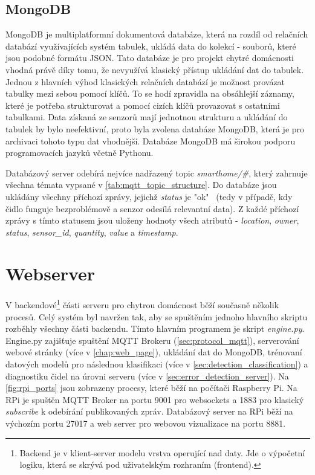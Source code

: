\subsection*{MongoDB}
MongoDB je multiplatformní dokumentová databáze, která na rozdíl od relačních databází využívajících systém tabulek, ukládá data do kolekcí - souborů, které jsou podobné formátu JSON. Tato databáze je pro projekt chytré domácnosti vhodná právě díky tomu, že nevyužívá klasický přístup ukládání dat do tabulek. Jednou z hlavních výhod klasických relačních databází je možnost provázat tabulky mezi sebou pomocí klíčů. To se hodí zpravidla na obsáhlejší záznamy, které je potřeba strukturovat a pomocí cizích klíčů provazovat s ostatními tabulkami. Data získaná ze senzorů mají jednotnou strukturu a ukládání do tabulek by bylo neefektivní, proto byla zvolena databáze MongoDB, která je pro archivaci tohoto typu dat vhodnější. Databáze MongoDB má širokou podporu programovacích jazyků včetně Pythonu. \par
Databázový server odebírá nejvíce nadřazený topic \textit{smarthome/\#}, který zahrnuje všechna témata vypsané v \cref{tab:mqtt_topic_structure}. Do databáze jsou ukládány všechny příchozí zprávy, jejichž \textit{status} je "ok" \ (tedy v případě, kdy čidlo funguje bezproblémově a senzor odesílá relevantní data). Z každé příchozí zprávy s tímto statusem jsou uloženy hodnoty všech atributů - \textit{location}, \textit{owner}, \textit{status}, \textit{sensor\_id}, \textit{quantity}, \textit{value} a \textit{timestamp}. \par

\section{Webserver} \label{sec:webserver}

V backendové\footnote{Backend je v klient-server modelu vrstva operující nad daty. Jde o výpočetní logiku, která se skrývá pod uživatelským rozhraním (frontend).} části serveru pro chytrou domácnost běží současně několik procesů. Celý systém byl navržen tak, aby se spuštěním jednoho hlavního skriptu rozběhly všechny části backendu. Tímto hlavním programem je skript \textit{engine.py}. Engine.py zajišťuje spuštění MQTT Brokeru (\cref{sec:protocol_mqtt}), serverování webové stránky (více v \cref{chap:web_page}), ukládání dat do MongoDB, trénovaní datových modelů pro následnou klasifikaci (více v \cref{sec:detection_classification}) a diagnostiku čidel na úrovni serveru (více v \cref{sec:error_detection_server}).  Na \cref{fig:rpi_ports} jsou zobrazeny procesy, které běží na počítači Raspberry Pi. Na RPi je spuštěn MQTT Broker na portu 9001 pro websockets a 1883 pro klasický \textit{subscribe} k odebírání publikovaných zpráv. Databázový server na RPi běží na výchozím portu 27017 a web server pro webovou vizualizace na portu 8881. 

